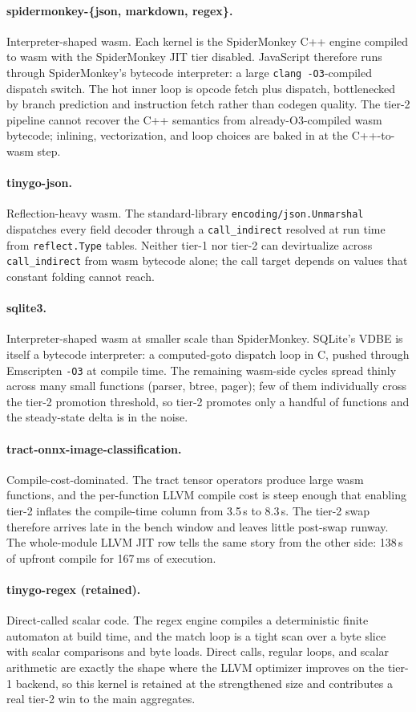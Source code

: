 \paragraph{spidermonkey-\{json, markdown, regex\}.} Interpreter-shaped wasm. Each kernel is the SpiderMonkey C++ engine compiled to wasm with the SpiderMonkey JIT tier disabled. JavaScript therefore runs through SpiderMonkey's bytecode interpreter: a large \texttt{clang -O3}-compiled dispatch switch. The hot inner loop is opcode fetch plus dispatch, bottlenecked by branch prediction and instruction fetch rather than codegen quality. The tier-2 pipeline cannot recover the C++ semantics from already-O3-compiled wasm bytecode; inlining, vectorization, and loop choices are baked in at the C++-to-wasm step.

\paragraph{tinygo-json.} Reflection-heavy wasm. The standard-library \texttt{encoding/json.Unmarshal} dispatches every field decoder through a \texttt{call\_indirect} resolved at run time from \texttt{reflect.Type} tables. Neither tier-1 nor tier-2 can devirtualize across \texttt{call\_indirect} from wasm bytecode alone; the call target depends on values that constant folding cannot reach.

\paragraph{sqlite3.} Interpreter-shaped wasm at smaller scale than SpiderMonkey. SQLite's VDBE is itself a bytecode interpreter: a computed-goto dispatch loop in C, pushed through Emscripten \texttt{-O3} at compile time. The remaining wasm-side cycles spread thinly across many small functions (parser, btree, pager); few of them individually cross the tier-2 promotion threshold, so tier-2 promotes only a handful of functions and the steady-state delta is in the noise.

\paragraph{tract-onnx-image-classification.} Compile-cost-dominated. The tract tensor operators produce large wasm functions, and the per-function LLVM compile cost is steep enough that enabling tier-2 inflates the compile-time column from 3.5\,s to 8.3\,s. The tier-2 swap therefore arrives late in the bench window and leaves little post-swap runway. The whole-module LLVM JIT row tells the same story from the other side: 138\,s of upfront compile for 167\,ms of execution.

\paragraph{tinygo-regex (retained).} Direct-called scalar code. The regex engine compiles a deterministic finite automaton at build time, and the match loop is a tight scan over a byte slice with scalar comparisons and byte loads. Direct calls, regular loops, and scalar arithmetic are exactly the shape where the LLVM optimizer improves on the tier-1 backend, so this kernel is retained at the strengthened size and contributes a real tier-2 win to the main aggregates.
